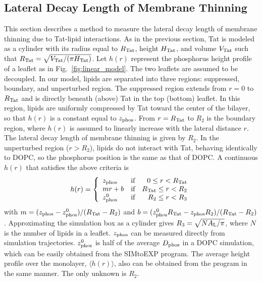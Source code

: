\subsection{Lateral Decay Length of Membrane Thinning}\label{sec:lateral_decay}
This section describes a method to measure the lateral decay length
of membrane thinning due to Tat-lipid interactions. 
As in the previous section, Tat is modeled as a cylinder with 
its radius equal to $R_\textrm{Tat}$, height $H_\textrm{Tat}$,
and volume $V_\textrm{Tat}$ such that $R_\textrm{Tat}=\sqrt{V_\textrm{Tat}/(\pi H_\textrm{Tat})}$. 
Let $h(r)$ represent the phosphorus height profile
of a leaflet as in Fig.~\ref{fig:linear_model}. The two leaflets are assumed to be decoupled.
In our model, lipids are separated into three regions: 
suppressed, boundary, and unperturbed region. 
The suppressed region extends from $r=0$ to $R_\textrm{Tat}$ and is directly beneath 
(above) Tat in the top (bottom) leaflet. In this region, lipids are uniformly 
compressed by Tat toward the 
center of the bilayer, so that $h(r)$ is a constant equal to $z_\textrm{phos}$. 
From $r=R_\textrm{Tat}$ to $R_2$ is the boundary region, where $h(r)$ is assumed to 
linearly increase with the lateral distance $r$. The lateral decay length
of membrane thinning is given by $R_2$. 
In the unperturbed region ($r>R_2$), lipids do not interact with 
Tat, behaving identically to DOPC, so the phosphorus position is the same as that of 
DOPC. A continuous $h(r)$ that 
satisfies the above criteria is
\begin{equation}
  h(r) = \left\{ 
  \begin{array}{lcr}
    z_\textrm{phos}   & \text{if} & 0   \leq r < R_\textrm{Tat} \\
    mr+b     & \text{if} & R_\textrm{Tat} \leq r < R_2 \\
    z_\textrm{phos}^0 & \text{if} & R_2 \leq r < R_3 
  \end{array}\right.  
\end{equation}     
with $m=(z_\textrm{phos}-z_\textrm{phos}^0)/(R_\textrm{Tat}-R_2)$ and $b=(z_\textrm{phos}^0R_\textrm{Tat}-z_\textrm{phos} R_2)/(R_\textrm{Tat}-R_2)$. 
Approximating the simulation box as a cylinder gives 
$R_3=\sqrt{NA_\textrm{L}/\pi}$, where $N$ is the number of lipids in a leaflet. 
$z_\textrm{phos}$ can be measured directly from simulation trajectories.
$z_\textrm{phos}^0$ is half of the average $D_\text{phos}$ in a DOPC simulation,
which can be easily obtained from the SIMtoEXP program. 
The average height profile over
the monolayer, $\langle h(r) \rangle$, also can be obtained from the program 
in the same manner. 
The only unknown is $R_2$.

